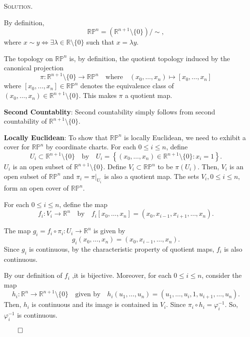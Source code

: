 \documentclass[12pt, a4paper, oneside]{ctexart}
\newenvironment{solution}{%
	\par\noindent\textsc{Solution. }\ignorespaces
}{%
	\hfill$\qed$\par
}
\begin{document}
	\begin{solution}
		
		By definition, 
	\[
	\mathbb{RP}^n = \left( \mathbb{R}^{n+1} \setminus \{ 0 \} \right) / \sim,
	\]
	where \(x \sim y \Leftrightarrow \exists \lambda \in \mathbb{R} \setminus \{ 0 \} \) such that \(x = \lambda y\).

	The topology on \(\mathbb{RP}^n\) is, by definition, the quotient topology induced by the canonical projection 
	\[
	\pi : \mathbb{R}^{n+1} \setminus \{ 0 \} \to \mathbb{RP}^n
	\quad \text{where} \quad
	(x_0, \dots, x_n) \mapsto [x_0, \dots, x_n]
	\]
	where \([x_0, \dots, x_n] \in \mathbb{RP}^n\) denotes the equivalence class of \((x_0, \dots, x_n) \in \mathbb{R}^{n+1} \setminus \{ 0 \}\). This makes \(\pi\) a quotient map.
	
	\textbf{Second Countablity}: Second countability simply follows from second countability of $\mathbb{R}^{n+1} \setminus \{ 0 \}$.
	
	\textbf{Locally Euclidean}:
	To show that \(\mathbb{RP}^n\) is locally Euclidean, we need to exhibit a cover for \(\mathbb{RP}^n\) by coordinate charts. For each \(0 \leq i \leq n\), define 
	\[
	U_i \subset \mathbb{R}^{n+1} \setminus \{ 0 \} \quad \text{by} \quad U_i = \left\{ (x_0, \dots, x_n) \in \mathbb{R}^{n+1} \setminus \{ 0 \} : x_i = 1 \right\}.
	\]
	\(U_i\) is an open subset of \(\mathbb{R}^{n+1} \setminus \{ 0 \}\). 
	Define \(V_i \subset \mathbb{RP}^n\) to be \(\pi(U_i)\). 
	Then, \(V_i\) is an open subset of \(\mathbb{RP}^n\) and \(\pi_i = \pi|_{U_i}\) 
	is also a quotient map. The sets \(V_i, 0 \leq i \leq n\), form an open cover of \(\mathbb{RP}^n\).

	For each \(0 \leq i \leq n\), define the map 
	\[
	f_i : V_i \to \mathbb{R}^n
	\quad \text{by} \quad
	f_i[x_0, \dots, x_n] = \left( x_0, x_{i-1}, x_{i+1}, \dots, x_n \right).
	\]

	The map \(g_i = f_i \circ \pi_i : U_i \to \mathbb{R}^n\) is given by 
	\[
	g_i(x_0, \dots, x_n) = \left( x_0, x_{i-1}, \dots, x_n \right).
	\]
	Since \(g_i\) is continuous, by the characteristic property of quotient maps, \(f_i\) is also continuous.


	By our definition of $f_i$ ,it is bijective. Moreover, for each \(0 \leq i \leq n\), 
	consider the map 
	\[
		h_i : \mathbb{R}^n \to \mathbb{R}^{n+1} \setminus \{ 0 \} \quad \text{given by} \quad h_i(u_1, \dots, u_n) = (u_1, \dots, u_i, 1, u_{i+1}, \dots, u_n).
	\]
	Then, \(h_i\) is continuous and its image is contained in \(V_i\). 
	Since \(\pi_i \circ h_i = \varphi_i^{-1}\). So, \(\varphi_i^{-1}\) is continuous.


\end{solution}
\end{document}
